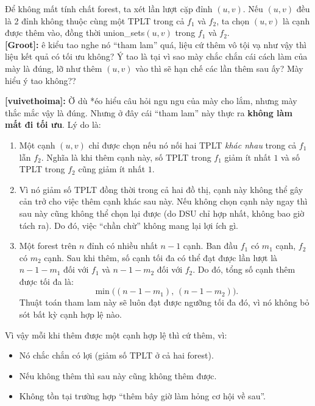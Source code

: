 \documentclass{article}
\begin{document}
Để không mất tính chất forest, ta xét lần lượt cặp đỉnh $(u, v)$. Nếu $(u, v)$ đều là 2 đỉnh không thuộc cùng một TPLT trong cả $f_1$ và $f_2$, ta chọn $(u, v)$ là cạnh được thêm vào, đồng thời union\_sets$(u, v)$ trong $f_1$ và $f_2$.\\

\textbf{[Groot]:} ê kiểu tao nghe nó ``tham lam'' quá, liệu cứ thêm vô tội vạ như vậy thì liệu kết quả có tối ưu không? Ý tao là tại vì sao mày chắc chắn cái cách làm của mày là đúng, lỡ như thêm $(u,v)$ vào thì sẽ hạn chế các lần thêm sau ấy? Mày hiểu ý tao không??

\textbf{[vuivethoima]:} Ờ dù *éo hiểu câu hỏi ngu ngu của mày cho lắm, nhưng mày thắc mắc vậy là đúng. Nhưng ở đây cái ``tham lam'' này thực ra \textbf{không làm mất đi tối ưu}. Lý do là:

\begin{enumerate}
    \item    Một cạnh $(u,v)$ chỉ được chọn nếu nó nối hai TPLT \emph{khác nhau} trong cả $f_1$ lẫn $f_2$.  
    Nghĩa là khi thêm cạnh này, số TPLT trong $f_1$ giảm ít nhất $1$ và số TPLT trong $f_2$ cũng giảm ít nhất $1$.

    \item Vì nó giảm số TPLT đồng thời trong cả hai đồ thị, cạnh này không thể gây cản trở cho việc thêm cạnh khác sau này.  
    Nếu không chọn cạnh này ngay thì sau này cũng không thể chọn lại được (do DSU chỉ hợp nhất, không bao giờ tách ra).  
    Do đó, việc ``chần chừ'' không mang lại lợi ích gì.

    \item Một forest trên $n$ đỉnh có nhiều nhất $n-1$ cạnh.  
    Ban đầu $f_1$ có $m_1$ cạnh, $f_2$ có $m_2$ cạnh.  
    Sau khi thêm, số cạnh tối đa có thể đạt được lần lượt là $n-1-m_1$ đối với $f_1$ và $n-1-m_2$ đối với $f_2$.  
    Do đó, tổng số cạnh thêm được tối đa là:
    \[
        \min\bigl((n-1-m_1),\,(n-1-m_2)\bigr).
    \]
    Thuật toán tham lam này sẽ luôn đạt được ngưỡng tối đa đó, vì nó không bỏ sót bất kỳ cạnh hợp lệ nào.
\end{enumerate}

\noindent
Vì vậy mỗi khi thêm được một cạnh hợp lệ thì cứ thêm, vì:
\begin{itemize}
    \item Nó chắc chắn có lợi (giảm số TPLT ở cả hai forest).
    \item Nếu không thêm thì sau này cũng không thêm được.
    \item Không tồn tại trường hợp ``thêm bây giờ làm hỏng cơ hội về sau''.
\end{itemize}
\end{document}
